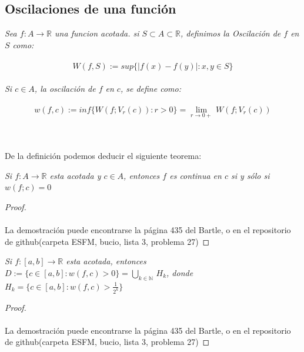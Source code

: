 \documentclass[11pt,letterpaper]{article}
\newcommand{\R}{\mathbb{R}}
\newcommand{\N}{\mathbb{N}}
\begin{document}
\subsection*{Oscilaciones de una funci\'on}
\begin{tcolorbox}[
	title = \textcolor{black}{\textcolor{white}{Definici\'on}},]
\textit{Sea $f:A\rightarrow \R$ una funcion acotada. si $S\subset A\subset \R$, definimos la Oscilaci\'on de 
$f$ en $S$ como:\,\\
\,\\
\begin{equation*}
        W(f,S):=sup\{|f(x)-f(y)|:x,y\in S\}
\end{equation*}\,\\
Si $c\in A$, la oscilaci\'on de $f$ en $c$, se define como:\,\\
\,\\
\begin{equation*}
    w(f,c):=inf\{W(f;V_r(c)):r>0\}=\lim_{r\rightarrow 0+}\,W(f;V_r(c))
\end{equation*}}
\end{tcolorbox}\,\\
\,\\
De la definici\'on podemos deducir el siguiente teorema:
\begin{tcolorbox}[
	title = \textcolor{black}{\textcolor{white}{Teorema 3}},]
\textit{Si $f:A\rightarrow\R$ esta acotada y $c\in A$, entonces $f$ es continua en $c$ si y s\'olo si $w(f;c)=0$}
\end{tcolorbox}
\begin{proof}\,\\
    \,\\
    La demostraci\'on puede encontrarse la p\'agina 435 del Bartle, o en el repositorio de github(carpeta ESFM, bucio, lista 3, problema 27)
\end{proof}
\newpage
\begin{tcolorbox}[
	title = \textcolor{black}{\textcolor{white}{Teorema 4}},]
\textit{Si $f:[a,b]\rightarrow\R$ esta acotada, entonces $D:=\{c\in [a,b]:w(f,c)>0\}=\bigcup_{k\in \N}\,H_k$, donde 
$H_k=\{c\in [a,b]:w(f,c)>\frac{1}{2^k}\}$}
\end{tcolorbox}
\begin{proof}\,\\
    \,\\
    La demostraci\'on puede encontrarse la p\'agina 435 del Bartle, o en el repositorio de github(carpeta ESFM, bucio, lista 3, problema 27)
\end{proof}
\end{document}

